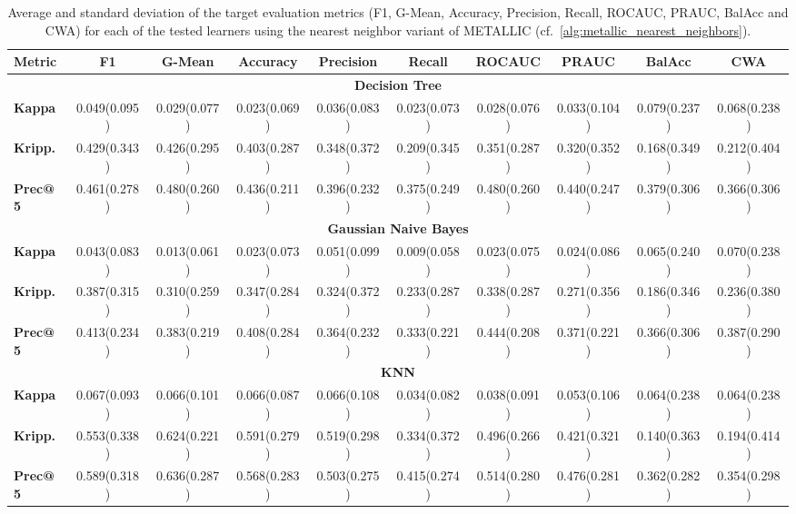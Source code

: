 \documentclass{article}
\begin{document}
\begin{sidewaystable}[!htbp]
\caption{Average and standard deviation of the target evaluation metrics (F1, G-Mean, Accuracy, Precision, Recall, ROCAUC, PRAUC, BalAcc and CWA) for each of the tested learners using the nearest neighbor variant of METALLIC (cf.~\autoref{alg:metallic_nearest_neighbors}).}\label{tab:nn_scores}
\centering
\small
\begin{tabular}{@{}lccccccccc@{}}
\toprule
\textbf{Metric} & \textbf{F1} & \textbf{G-Mean} & \textbf{Accuracy} & \textbf{Precision} & \textbf{Recall} & \textbf{ROCAUC} & \textbf{PRAUC} & \textbf{BalAcc} & \textbf{CWA} \\
\midrule
\multicolumn{10}{c}{\textbf{Decision Tree}}\\
\midrule
\textbf{Kappa} & 0.049(0.095) & 0.029(0.077) & 0.023(0.069) & 0.036(0.083) & 0.023(0.073) & 0.028(0.076) & 0.033(0.104) & 0.079(0.237) & 0.068(0.238) \\
\textbf{Kripp.} & 0.429(0.343) & 0.426(0.295) & 0.403(0.287) & 0.348(0.372) & 0.209(0.345) & 0.351(0.287) & 0.320(0.352) & 0.168(0.349) & 0.212(0.404) \\
\textbf{Prec@5} & 0.461(0.278) & 0.480(0.260) & 0.436(0.211) & 0.396(0.232) & 0.375(0.249) & 0.480(0.260) & 0.440(0.247) & 0.379(0.306) & 0.366(0.306) \\
\midrule
\multicolumn{10}{c}{\textbf{Gaussian Naive Bayes}}\\
\midrule
\textbf{Kappa} & 0.043(0.083) & 0.013(0.061) & 0.023(0.073) & 0.051(0.099) & 0.009(0.058) & 0.023(0.075) & 0.024(0.086) & 0.065(0.240) & 0.070(0.238) \\
\textbf{Kripp.} & 0.387(0.315) & 0.310(0.259) & 0.347(0.284) & 0.324(0.372) & 0.233(0.287) & 0.338(0.287) & 0.271(0.356) & 0.186(0.346) & 0.236(0.380) \\
\textbf{Prec@5} & 0.413(0.234) & 0.383(0.219) & 0.408(0.284) & 0.364(0.232) & 0.333(0.221) & 0.444(0.208) & 0.371(0.221) & 0.366(0.306) & 0.387(0.290) \\
\midrule
\multicolumn{10}{c}{\textbf{KNN}}\\
\midrule
\textbf{Kappa} & 0.067(0.093) & 0.066(0.101) & 0.066(0.087) & 0.066(0.108) & 0.034(0.082) & 0.038(0.091) & 0.053(0.106) & 0.064(0.238) & 0.064(0.238) \\
\textbf{Kripp.} & 0.553(0.338) & 0.624(0.221) & 0.591(0.279) & 0.519(0.298) & 0.334(0.372) & 0.496(0.266) & 0.421(0.321) & 0.140(0.363) & 0.194(0.414) \\
\textbf{Prec@5} & 0.589(0.318) & 0.636(0.287) & 0.568(0.283) & 0.503(0.275) & 0.415(0.274) & 0.514(0.280) & 0.476(0.281) & 0.362(0.282) & 0.354(0.298) \\

\end{tabular}
\end{sidewaystable}
\end{document}

